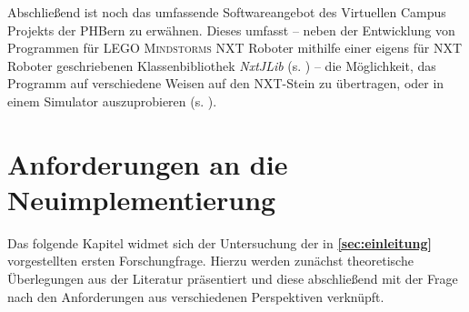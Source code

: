 \documentclass[paper=a4, DIV=calc, BCOR=12mm, twoside=on, onecolumn=on, open = right, titlepage =on, parskip =half-, headsepline = on, footsepline = off, chapterprefix = off, appendixprefix = on, fontsize = 12pt, numbers = noenddot, abstract = on]{scrbook}
\begin{document}
Abschließend ist noch das umfassende Softwareangebot des Virtuellen Campus Projekts der PHBern zu erwähnen. Dieses umfasst -- neben der Entwicklung von Programmen für \textsc{LEGO Mindstorms} NXT Roboter mithilfe einer eigens für NXT Roboter geschriebenen Klassenbibliothek \emph{NxtJLib} (s. \cite{aegidius:16}) -- die Möglichkeit, das Programm auf verschiedene Weisen auf den NXT-Stein zu übertragen, oder in einem Simulator auszuprobieren (s. \cite{phbern}). 

\par \singlespacing
\chapter{Anforderungen an die Neu\-im\-ple\-men\-tie\-rung}
\label{chap:anforderungen}
\onehalfspacing
Das folgende Kapitel widmet sich der Untersuchung der in \textbf{\ref{sec:einleitung}} vorgestellten ersten Forschungfrage. Hierzu werden zunächst theoretische Überlegungen aus der Literatur präsentiert und diese abschließend mit der Frage nach den Anforderungen aus verschiedenen Perspektiven verknüpft.
\end{document}
